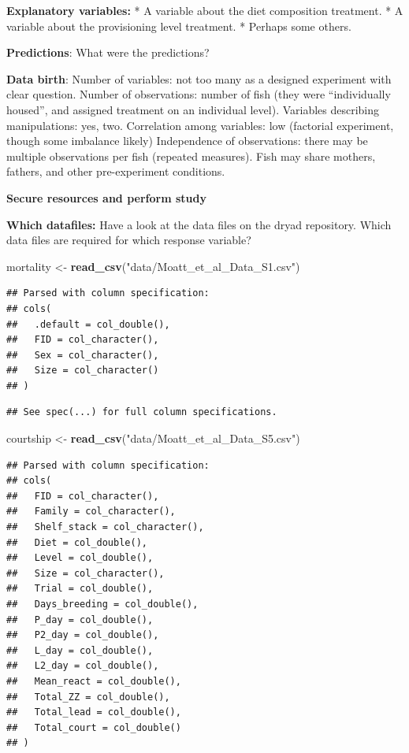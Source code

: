 \documentclass[]{book}
\newenvironment{Shaded}{\begin{snugshade}}{\end{snugshade}}
\newcommand{\KeywordTok}[1]{\textcolor[rgb]{0.13,0.29,0.53}{\textbf{#1}}}
\newcommand{\NormalTok}[1]{#1}
\newcommand{\StringTok}[1]{\textcolor[rgb]{0.31,0.60,0.02}{#1}}
\begin{document}
\textbf{Explanatory variables:}
* A variable about the diet composition treatment.
* A variable about the provisioning level treatment.
* Perhaps some others.

\textbf{Predictions}:
What were the predictions?

\textbf{Data birth}:
Number of variables: not too many as a designed experiment with clear question.
Number of observations: number of fish (they were ``individually housed'', and assigned treatment on an individual level).
Variables describing manipulations: yes, two.
Correlation among variables: low (factorial experiment, though some imbalance likely)
Independence of observations: there may be multiple observations per fish (repeated measures). Fish may share mothers, fathers, and other pre-experiment conditions.

\textbf{Secure resources and perform study}

\textbf{Which datafiles:} Have a look at the data files on the dryad repository. Which data files are required for which response variable?

\begin{Shaded}
\begin{Highlighting}[]
\NormalTok{mortality <-}\StringTok{ }\KeywordTok{read_csv}\NormalTok{(}\StringTok{"data/Moatt_et_al_Data_S1.csv"}\NormalTok{)}
\end{Highlighting}
\end{Shaded}

\begin{verbatim}
## Parsed with column specification:
## cols(
##   .default = col_double(),
##   FID = col_character(),
##   Sex = col_character(),
##   Size = col_character()
## )
\end{verbatim}

\begin{verbatim}
## See spec(...) for full column specifications.
\end{verbatim}

\begin{Shaded}
\begin{Highlighting}[]
\NormalTok{courtship <-}\StringTok{ }\KeywordTok{read_csv}\NormalTok{(}\StringTok{"data/Moatt_et_al_Data_S5.csv"}\NormalTok{)}
\end{Highlighting}
\end{Shaded}

\begin{verbatim}
## Parsed with column specification:
## cols(
##   FID = col_character(),
##   Family = col_character(),
##   Shelf_stack = col_character(),
##   Diet = col_double(),
##   Level = col_double(),
##   Size = col_character(),
##   Trial = col_double(),
##   Days_breeding = col_double(),
##   P_day = col_double(),
##   P2_day = col_double(),
##   L_day = col_double(),
##   L2_day = col_double(),
##   Mean_react = col_double(),
##   Total_ZZ = col_double(),
##   Total_lead = col_double(),
##   Total_court = col_double()
## )
\end{verbatim}
\end{document}
